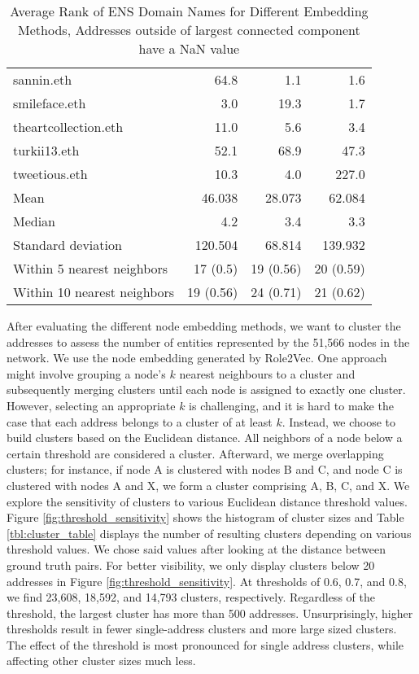 \documentclass[12pt,a4paper,titlepage,oneside,english]{article}
\begin{document}
\begin{table}[h!]
\begin{tabular}{lrrr}
	sannin.eth & 64.8 & 1.1 & 1.6 \\
	smileface.eth & 3.0 & 19.3 & 1.7 \\
	theartcollection.eth & 11.0 & 5.6 & 3.4 \\
	turkii13.eth & 52.1 & 68.9 & 47.3 \\
	tweetious.eth & 10.3 & 4.0 & 227.0 \\
    \hline
    Mean & 46.038 & 28.073 & 62.084 \\
    Median & 4.2 & 3.4 & 3.3 \\
    Standard deviation & 120.504 & 68.814 &  139.932\\
    Within 5 nearest neighbors & 17 (0.5) & 19 (0.56) & 20 (0.59) \\
    Within 10 nearest neighbors & 19 (0.56) & 24 (0.71) & 21 (0.62)\\
    \hline
  \end{tabular}
  \caption{Average Rank of ENS Domain Names for Different Embedding Methods, Addresses outside of largest connected component have a NaN value}
  \label{tbl:ENS_Domain_Ranks}
\end{table}

After evaluating the different node embedding methods, we want to cluster the addresses to assess the number of entities represented by the 51,566 nodes in the network. We use the node embedding generated by Role2Vec. \newline
One approach might involve grouping a node's $k$ nearest neighbours to a cluster and subsequently merging clusters until each node is assigned to exactly one cluster. However, selecting an appropriate $k$ is challenging, and it is hard to make the case that each address belongs to a cluster of at least $k$. \newline
Instead, we choose to build clusters based on the Euclidean distance. All neighbors of a node below a certain threshold are considered a cluster. Afterward, we merge overlapping clusters; for instance, if node A is clustered with nodes B and C, and node C is clustered with nodes A and X, we form a cluster comprising A, B, C, and X. \newline
We explore the sensitivity of clusters to various Euclidean distance threshold values. Figure \ref{fig:threshold_sensitivity} shows the histogram of cluster sizes and Table \ref{tbl:cluster_table} displays the number of resulting clusters depending on various threshold values. We chose said values after looking at the distance between ground truth pairs. For better visibility, we only display clusters below 20 addresses in Figure \ref{fig:threshold_sensitivity}. At thresholds of 0.6, 0.7, and 0.8, we find 23,608, 18,592, and 14,793 clusters, respectively. Regardless of the threshold, the largest cluster has more than 500 addresses. Unsurprisingly, higher thresholds result in fewer single-address clusters and more large sized clusters. The effect of the threshold is most pronounced for single address clusters, while affecting other cluster sizes much less. 
\end{document}
